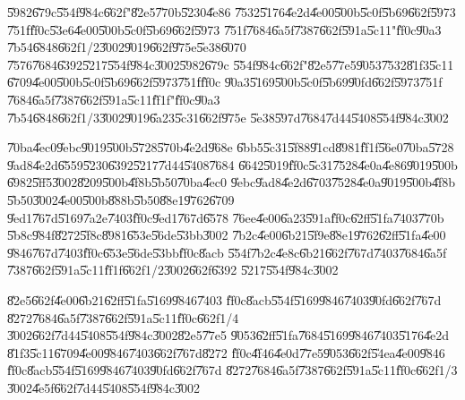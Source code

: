 \documentclass{article}
\begin{document}
\bigskip

\U{5982}\U{679c}\U{554f}\U{984c}\U{662f}"\U{82e5}\U{770b}\U{5230}\U{4e86}%
\U{7532}\U{5176}\U{4e2d}\U{4e00}\U{500b}\U{5c0f}\U{5b69}\U{662f}\U{5973}%
\U{751f}\U{ff0c}\U{53e6}\U{4e00}\U{500b}\U{5c0f}\U{5b69}\U{662f}\U{5973}%
\U{751f}\U{7684}\U{6a5f}\U{7387}\U{662f}\U{591a}\U{5c11}"\U{ff0c}\U{90a3}%
\U{7b54}\U{6848}\U{662f}1/2\U{3002}\U{9019}\U{662f}\U{975e}\U{5e38}\U{6070}%
\U{7576}\U{7684}\U{6392}\U{5217}\U{554f}\U{984c}\U{3002}\U{5982}\U{679c}%
\U{554f}\U{984c}\U{662f}"\U{82e5}\U{77e5}\U{9053}\U{7532}\U{81f3}\U{5c11}%
\U{6709}\U{4e00}\U{500b}\U{5c0f}\U{5b69}\U{662f}\U{5973}\U{751f}\U{ff0c}%
\U{90a3}\U{5169}\U{500b}\U{5c0f}\U{5b69}\U{90fd}\U{662f}\U{5973}\U{751f}%
\U{7684}\U{6a5f}\U{7387}\U{662f}\U{591a}\U{5c11}\U{ff1f}"\U{ff0c}\U{90a3}%
\U{7b54}\U{6848}\U{662f}1/3\U{3002}\U{9019}\U{6a23}\U{5c31}\U{662f}\U{975e}%
\U{5e38}\U{597d}\U{7684}\U{7d44}\U{5408}\U{554f}\U{984c}\U{3002}

\bigskip

\U{70ba}\U{4ec0}\U{9ebc}\U{9019}\U{500b}\U{5728}\U{570b}\U{4e2d}\U{968e}%
\U{6bb5}\U{5c31}\U{5f88}\U{91cd}\U{8981}\U{ff1f}\U{56e0}\U{70ba}\U{5728}%
\U{9ad8}\U{4e2d}\U{6559}\U{5230}\U{6392}\U{5217}\U{7d44}\U{5408}\U{7684}%
\U{6642}\U{5019}\U{ff0c}\U{5c31}\U{7528}\U{4e0a}\U{4e86}\U{9019}\U{500b}%
\U{6982}\U{5ff5}\U{3002}\U{8209}\U{500b}\U{4f8b}\U{5b50}\U{70ba}\U{4ec0}%
\U{9ebc}\U{9ad8}\U{4e2d}\U{6703}\U{7528}\U{4e0a}\U{9019}\U{500b}\U{4f8b}%
\U{5b50}\U{3002}\U{4e00}\U{500b}\U{888b}\U{5b50}\U{88e1}\U{9762}\U{6709}%
\U{9ed1}\U{767d}\U{5169}\U{7a2e}\U{7403}\U{ff0c}\U{9ed1}\U{767d}\U{6578}%
\U{76ee}\U{4e00}\U{6a23}\U{591a}\U{ff0c}\U{62ff}\U{51fa}\U{7403}\U{770b}%
\U{5b8c}\U{984f}\U{8272}\U{5f8c}\U{8981}\U{653e}\U{56de}\U{53bb}\U{3002}%
\U{7b2c}\U{4e00}\U{6b21}\U{5f9e}\U{88e1}\U{9762}\U{62ff}\U{51fa}\U{4e00}%
\U{9846}\U{767d}\U{7403}\U{ff0c}\U{653e}\U{56de}\U{53bb}\U{ff0c}\U{8acb}%
\U{554f}\U{7b2c}\U{4e8c}\U{6b21}\U{662f}\U{767d}\U{7403}\U{7684}\U{6a5f}%
\U{7387}\U{662f}\U{591a}\U{5c11}\U{ff1f}\U{662f}1/2\U{3002}\U{662f}\U{6392}%
\U{5217}\U{554f}\U{984c}\U{3002}

\bigskip

\U{82e5}\U{662f}\U{4e00}\U{6b21}\U{62ff}\U{51fa}\U{5169}\U{9846}\U{7403}%
\U{ff0c}\U{8acb}\U{554f}\U{5169}\U{9846}\U{7403}\U{90fd}\U{662f}\U{767d}%
\U{8272}\U{7684}\U{6a5f}\U{7387}\U{662f}\U{591a}\U{5c11}\U{ff0c}\U{662f}1/4%
\U{3002}\U{662f}\U{7d44}\U{5408}\U{554f}\U{984c}\U{3002}\U{82e5}\U{77e5}%
\U{9053}\U{62ff}\U{51fa}\U{7684}\U{5169}\U{9846}\U{7403}\U{5176}\U{4e2d}%
\U{81f3}\U{5c11}\U{6709}\U{4e00}\U{9846}\U{7403}\U{662f}\U{767d}\U{8272}%
\U{ff0c}\U{4f46}\U{4e0d}\U{77e5}\U{9053}\U{662f}\U{54ea}\U{4e00}\U{9846}%
\U{ff0c}\U{8acb}\U{554f}\U{5169}\U{9846}\U{7403}\U{90fd}\U{662f}\U{767d}%
\U{8272}\U{7684}\U{6a5f}\U{7387}\U{662f}\U{591a}\U{5c11}\U{ff0c}\U{662f}1/3%
\U{3002}\U{4e5f}\U{662f}\U{7d44}\U{5408}\U{554f}\U{984c}\U{3002}
\end{document}
